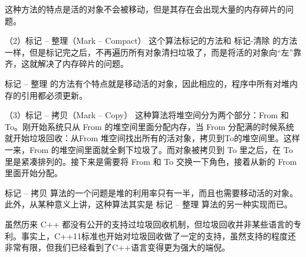 这种方法的特点是活的对象不会被移动，但是其存在会出现大量的内存碎片的问题。

（2）标记 – 整理（Mark – Compact）
这个算法标记的方法和 标记-清除 的方法一样，但是标记完之后，不再遍历所有对象清扫垃圾了，而是将活的对象向“左”靠齐，这就解决了内存碎片的问题。

标记 – 整理 的方法有个特点就是移动活的对象，因此相应的，程序中所有对堆内存的引用都必须更新。

（3）标记 – 拷贝（Mark – Copy）
这种算法将堆空间分为两个部分：From 和 To。刚开始系统只从 From  的堆空间里面分配内存，当 From 分配满的时候系统就开始垃圾回收：从From 堆空间找出所有的活对象，拷贝到To的堆空间里。这样一来，From 
的堆空间里面就全剩下垃圾了。而对象被拷贝到 To 里之后，在 To 里是紧凑排列的。接下来是需要将 From 和 To 交换一下角色，接着从新的 From 里面开始分配。

标记 – 拷贝 算法的一个问题是堆的利用率只有一半，而且也需要移动活的对象。此外，从某种意义上讲，这种算法其实是 标记 – 整理 算法的另一种实现而已。

虽然历来 C++ 都没有公开的支持过垃圾回收机制，但垃圾回收并非某些语言的专利。事实上，C++11标准也开始对垃圾回收做了一定的支持，虽然支持的程度还非常有限，但我们已经看到了C++语言变得更为强大的端倪。